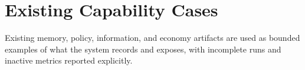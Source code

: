 \section{Existing Capability Cases}
Existing memory, policy, information, and economy artifacts are used as bounded examples of what the
system records and exposes, with incomplete runs and inactive metrics reported explicitly.
